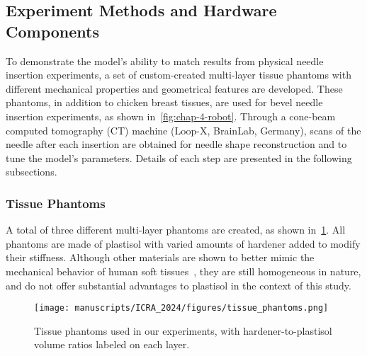 \subsection{Experiment Methods and Hardware Components}
\label{sec:chap-4-experiment-methods}

To demonstrate the model's ability to match results from physical needle insertion experiments, a set of custom-created multi-layer tissue phantoms with different mechanical properties and geometrical features are developed. These phantoms, in addition to chicken breast tissues, are used for bevel needle insertion experiments, as shown in~\cref{fig:chap-4-robot}. Through a cone-beam computed tomography (CT) machine (Loop-X, BrainLab, Germany), scans of the needle after each insertion are obtained for needle shape reconstruction and to tune the model's parameters. Details of each step are presented in the following subsections.

\subsubsection{Tissue Phantoms}
\label{sec:chap-4-developed-phantoms}

A total of three different multi-layer phantoms are created, as shown in~\cref{fig:chap-4-phantoms}. All phantoms are made of plastisol with varied amounts of hardener added to modify their stiffness. Although other materials are shown to better mimic the mechanical behavior of human soft tissues~\parencite{tejo-oteroSoftTissueMimickingUsingHydrogels2022}, they are still homogeneous in nature, and do not offer substantial advantages to plastisol in the context of this study. 

\begin{figure}[t]
  \centering
  \texttt{[image: manuscripts/ICRA\_2024/figures/tissue\_phantoms.png]}
  \caption{Tissue phantoms used in our experiments, with hardener-to-plastisol volume ratios labeled on each layer.}
  \label{fig:chap-4-phantoms}
\end{figure}

